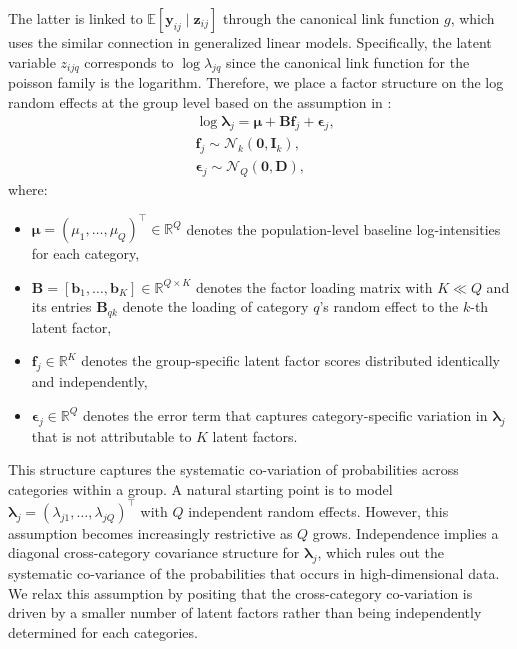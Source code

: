 \documentclass[]{report}
\theoremstyle{definition}
\begin{document}
The latter is linked to $\mathbb{E}[\bm{y}_{ij}\mid \bm{z}_{ij}]$ through the canonical link function $g$, which uses the similar connection in generalized linear models. Specifically, the latent variable $z_{ijq}$ corresponds to $\log \lambda_{jq}$ since the canonical link function for the poisson family is the logarithm. Therefore, we place a factor structure on the log random effects at the group level based on the assumption in \cite{chiquet2018variational}:
\begin{equation}
    \begin{aligned}
        & \log \bm{\lambda}_{j}=\bm{\mu}+\mathbf{B}\mathbf{f}_j+\bm{\epsilon}_{j},\\
        & \mathbf{f}_j \sim \mathcal{N}_k(\mathbf{0}, \bm{I}_k),\\
        & \bm{\epsilon}_j \sim \mathcal{N}_Q(\mathbf{0}, \mathbf{D}),
    \end{aligned}
\end{equation} 
where:
\begin{itemize}
\item $\boldsymbol{\mu}=(\mu_{1},\dots ,\mu_{Q})^{\top}\in \mathbb{R}^{Q}$ denotes the population-level baseline log-intensities for each category,
\item $\mathbf{B}=[\boldsymbol{b}_{1},\dots ,\boldsymbol{b}_{K}]\in \mathbb{R}^{Q\times K}$ denotes the factor loading matrix with $K\ll Q$ and its entries $\mathbf{B}_{qk}$ denote the loading of category $q$'s random effect to the $k$-th latent factor,
\item $\bm{f}_{j}\in \mathbb{R}^{K}$ denotes the group-specific latent factor scores distributed identically and independently,
\item $\bm{\epsilon}_{j}\in \mathbb{R}^{Q}$ denotes the error term that captures category-specific variation in $\boldsymbol{\lambda}_{j}$ that is not attributable to $K$ latent factors. 
\end{itemize}
This structure captures the systematic co-variation of probabilities across categories within a group. A natural starting point is to model $\bm{\lambda}_{j}=(\lambda_{j1},\dots ,\lambda_{jQ})^{\top}$ with $Q$ independent random effects. However, this assumption becomes increasingly restrictive as $Q$ grows. Independence implies a diagonal cross-category covariance structure for $\bm{\lambda}_{j}$, which rules out the systematic co-variance of the probabilities that occurs in high-dimensional data. We relax this assumption by positing that the cross-category co-variation is driven by a smaller number of latent factors rather than being independently determined for each categories. 
\end{document}
